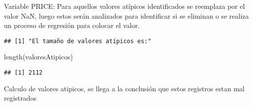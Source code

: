 \documentclass[
]{article}
\newenvironment{Shaded}{\begin{snugshade}}{\end{snugshade}}
\newcommand{\ConstantTok}[1]{\textcolor[rgb]{0.00,0.00,0.00}{#1}}
\newcommand{\FunctionTok}[1]{\textcolor[rgb]{0.00,0.00,0.00}{#1}}
\newcommand{\NormalTok}[1]{#1}
\newcommand{\OtherTok}[1]{\textcolor[rgb]{0.56,0.35,0.01}{#1}}
\newcommand{\SpecialCharTok}[1]{\textcolor[rgb]{0.00,0.00,0.00}{#1}}
\newcommand{\StringTok}[1]{\textcolor[rgb]{0.31,0.60,0.02}{#1}}
\begin{document}
\begin{Shaded}
\end{Shaded}

Variable PRICE: Para aquellos valores atípicos identificados se
reemplaza por el valor NaN, luego estos serán analizados para
identificar si se eliminan o se realiza un proceso de regresión para
colocar el valor.

\begin{Shaded}
\end{Shaded}

\begin{verbatim}
## [1] "El tamaño de valores atípicos es:"
\end{verbatim}

\begin{Shaded}
\begin{Highlighting}[]
\FunctionTok{length}\NormalTok{(valoresAtipicos)}
\end{Highlighting}
\end{Shaded}

\begin{verbatim}
## [1] 2112
\end{verbatim}

\begin{Shaded}
\end{Shaded}

Calculo de valores atipicos, se llega a la conclusión que estos
registros estan mal registrados
\end{document}
